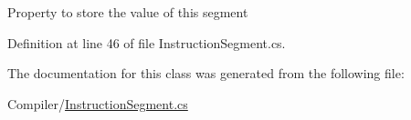 Property to store the value of this segment 



Definition at line 46 of file Instruction\+Segment.\+cs.



The documentation for this class was generated from the following file\+:\begin{DoxyCompactItemize}
\item 
Compiler/\hyperlink{_instruction_segment_8cs}{Instruction\+Segment.\+cs}\end{DoxyCompactItemize}
